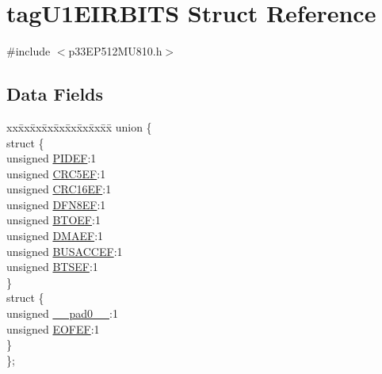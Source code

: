 \hypertarget{structtag_u1_e_i_r_b_i_t_s}{}\section{tag\+U1\+E\+I\+R\+B\+I\+TS Struct Reference}
\label{structtag_u1_e_i_r_b_i_t_s}


{\ttfamily \#include $<$p33\+E\+P512\+M\+U810.\+h$>$}

\subsection*{Data Fields}
\begin{DoxyCompactItemize}
\item 
\begin{tabbing}
xx\=xx\=xx\=xx\=xx\=xx\=xx\=xx\=xx\=\kill
union \{\\
\>struct \{\\
\>\>unsigned \hyperlink{structtag_u1_e_i_r_b_i_t_s_ab25b04d497c6897c0e29ba709ddb08f1}{PIDEF}:1\\
\>\>unsigned \hyperlink{structtag_u1_e_i_r_b_i_t_s_afd4dc0ce62a7a67a8e612305428b770d}{CRC5EF}:1\\
\>\>unsigned \hyperlink{structtag_u1_e_i_r_b_i_t_s_a2d215c66eaeedd3038b2026922fda9ab}{CRC16EF}:1\\
\>\>unsigned \hyperlink{structtag_u1_e_i_r_b_i_t_s_a4adf668f56d8349a0561f7064468daf3}{DFN8EF}:1\\
\>\>unsigned \hyperlink{structtag_u1_e_i_r_b_i_t_s_af95a6f9aa418d308dc014ee9045d7f45}{BTOEF}:1\\
\>\>unsigned \hyperlink{structtag_u1_e_i_r_b_i_t_s_af5764db5e75300406e70c879bfb27cbf}{DMAEF}:1\\
\>\>unsigned \hyperlink{structtag_u1_e_i_r_b_i_t_s_a6b4372435b6de674aafda91cabb41308}{BUSACCEF}:1\\
\>\>unsigned \hyperlink{structtag_u1_e_i_r_b_i_t_s_ae5c0df0e70b0a866235c3c0143239020}{BTSEF}:1\\
\>\} \\
\>struct \{\\
\>\>unsigned \hyperlink{structtag_u1_e_i_r_b_i_t_s_adf71f3d8410c1f1dbbc96680a92c49af}{\_\_pad0\_\_}:1\\
\>\>unsigned \hyperlink{structtag_u1_e_i_r_b_i_t_s_a57cc6da26db7ea6833539903744032f7}{EOFEF}:1\\
\>\} \\
\}; \\

\end{tabbing}\end{DoxyCompactItemize}


